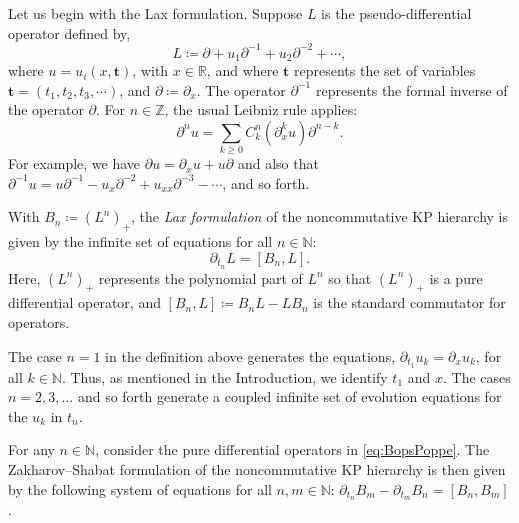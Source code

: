 \documentclass[5p,twocolumn]{elsarticle}
\newcommand*{\R}{\mathbb R}
\newcommand*{\pa}{{\partial}}
\newcommand*{\tbf}{\boldsymbol{t}}
\begin{document}
Let us begin with the Lax formulation. Suppose $L$ is the pseudo-differential operator defined by,  
\begin{equation}\label{eq:L}
L\coloneqq \pa+u_1\pa^{-1}+u_2\pa^{-2}+\cdots,
\end{equation}
where $u=u_i(x,\tbf)$, with $x\in\R$, and where $\tbf$ represents the set of variables $\tbf=(t_1,t_2,t_3,\cdots)$, and $\pa\coloneqq\pa_x$.
The operator $\pa^{-1}$ represents the formal inverse of the operator $\pa$.
For $n\in\mathbb Z$, the usual Leibniz rule applies:
\begin{equation*}
\pa^n u=\sum_{k\geqslant0}C^n_k(\pa_x^k u)\pa^{n-k}.
\end{equation*}
For example, we have $\pa u=\pa_xu+u\pa$ and also that $\pa^{-1}u=u\pa^{-1}-u_x\pa^{-2}+u_{xx}\pa^{-3}-\cdots$, and so forth.
%
\begin{definition}\label{def:Laxform}
With $B_n\coloneqq (L^n)_+$, the \emph{Lax formulation} of the noncommutative KP hierarchy is given by the infinite set of equations for all $n\in\mathbb N$:
\begin{equation}\label{eq:KPLaxform}
\pa_{t_n}L=[B_n,L].
\end{equation}
Here, $(L^n)_+$ represents the polynomial part of $L^n$ so that $(L^n)_+$ is a pure differential operator, and $[B_n,L]\coloneqq B_n L-L B_n$ is the standard commutator for operators.
\end{definition}
%
The case $n=1$ in the definition above generates the equations, $\pa_{t_1}u_k=\pa_x u_k$, for all $k\in\mathbb N$.
Thus, as mentioned in the Introduction, we identify $t_1$ and $x$.
The cases $n=2,3,\ldots$ and so forth generate a coupled infinite set of evolution equations for the $u_k$ in $t_n$.
%
\begin{definition}\label{def:ZSform}
  For any $n\in\mathbb N$, consider the pure differential operators in \eqref{eq:BopsPoppe}.
  The Zakharov--Shabat formulation of the noncommutative KP hierarchy is then given by the following system of equations for all $n,m\in\mathbb N$: $\pa_{t_n}B_m-\pa_{t_m}B_n=[B_n,B_m]$.
\end{definition}
%
\end{document}
